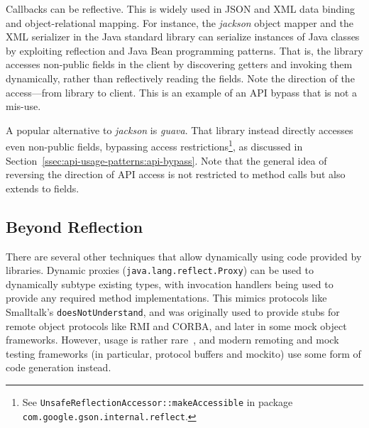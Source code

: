 

Callbacks can be reflective. This is widely used in JSON and XML data binding and object-relational mapping. For instance, the \textit{jackson} object mapper and the XML serializer in the Java standard library can serialize instances of Java classes by exploiting reflection and Java Bean programming patterns. That is, the library accesses non-public fields in the client by discovering getters and invoking them dynamically, rather than reflectively reading the fields. Note the direction of the access---from library to client. This is an example of an API bypass that is not a mis-use.


A popular alternative to \textit{jackson} is \textit{guava}. That library instead directly accesses even non-public fields, bypassing access restrictions\footnote{See \texttt{UnsafeReflectionAccessor::makeAccessible} in package \texttt{com.google.gson.internal.reflect}.}, as discussed in Section~\ref{ssec:api-usage-patterns:api-bypass}. Note that the general idea of reversing the direction of API access is not restricted to method calls but also extends to fields.

\subsection{Beyond Reflection}

There are several other techniques that allow dynamically using code provided by libraries. Dynamic proxies (\texttt{java.lang.reflect.Proxy}) can be used to dynamically subtype existing types, with invocation handlers being used to provide any required method implementations.  This mimics protocols like Smalltalk's \texttt{doesNotUnderstand}, and was originally used to provide stubs for remote object protocols like RMI and CORBA, and later in some mock object frameworks. However, usage is rather rare~\cite{dietrich2017xcorpus}, and modern remoting and mock testing frameworks (in particular, protocol buffers and mockito) use some form of code generation instead. 


